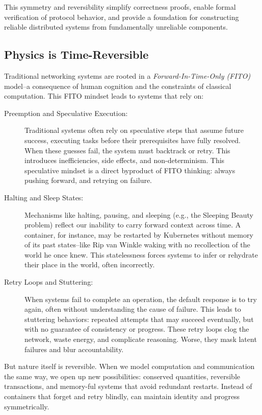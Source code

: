 \documentclass[../../../OAE-SPEC-MAIN.tex]{subfiles}
\begin{document}
This symmetry and reversibility simplify correctness proofs, enable formal verification of protocol behavior, and provide a foundation for constructing reliable distributed systems from fundamentally unreliable components.


\subsection*{Physics is Time-Reversible}

Traditional networking systems are rooted in a \emph{Forward-In-Time-Only (FITO)} model--a consequence of human cognition and the constraints of classical computation. This FITO mindset leads to systems that rely on:
\begin{description}
\item[Preemption and Speculative Execution:]
Traditional systems often rely on speculative steps that assume future success, executing tasks before their prerequisites have fully resolved. When these guesses fail, the system must backtrack or retry. This introduces inefficiencies, side effects, and non-determinism. This speculative mindset is a direct byproduct of FITO thinking: always pushing forward, and retrying on failure.

\item[Halting and Sleep States:]
Mechanisms like halting, pausing, and sleeping (e.g., the Sleeping Beauty problem) reflect our inability to carry forward context across time. A container, for instance, may be restarted by Kubernetes without memory of its past states--like Rip van Winkle waking with no recollection of the world he once knew. This statelessness forces systems to infer or rehydrate their place in the world, often incorrectly.

\item[Retry Loops and Stuttering:]
When systems fail to complete an operation, the default response is to try again, often without understanding the cause of failure. This leads to stuttering behaviors: repeated attempts that may succeed eventually, but with no guarantee of consistency or progress. These retry loops clog the network, waste energy, and complicate reasoning. Worse, they mask latent failures and blur accountability.
\end{description}

But nature itself is reversible. When we model computation and communication the same way, we open up new possibilities: conserved quantities, reversible transactions, and memory-ful systems that avoid redundant restarts. Instead of containers that forget and retry blindly, \LINKs can maintain identity and progress symmetrically.
\end{document}
